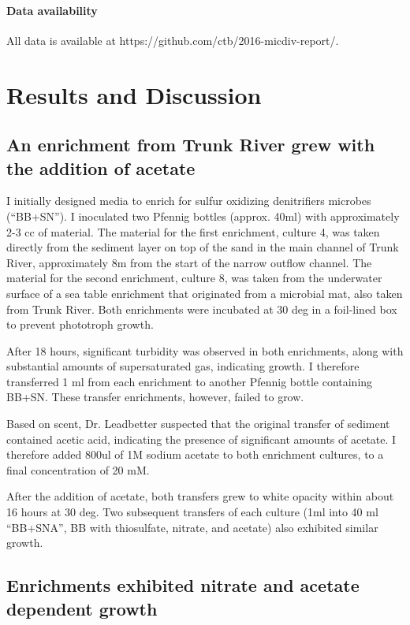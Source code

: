 \documentclass{article}
\begin{document}
\paragraph{Data availability}

All data is available at https://github.com/ctb/2016-micdiv-report/.

\section*{Results and Discussion}

\subsection*{An enrichment from Trunk River grew with the addition of acetate}

I initially designed media to enrich for sulfur oxidizing denitrifiers
microbes (``BB+SN'').  I inoculated two Pfennig bottles (approx. 40ml)
with approximately 2-3 cc of material.  The material for the first
enrichment, culture 4, was taken directly from the sediment layer on
top of the sand in the main channel of Trunk River, approximately 8m
from the start of the narrow outflow channel. The material for the
second enrichment, culture 8, was taken from the underwater surface of
a sea table enrichment that originated from a microbial mat, also
taken from Trunk River.  Both enrichments were incubated at 30 deg
in a foil-lined box to prevent phototroph growth.

After 18 hours, significant turbidity was observed in both
enrichments, along with substantial amounts of supersaturated gas,
indicating growth.  I therefore transferred 1 ml from each enrichment
to another Pfennig bottle containing BB+SN.  These transfer
enrichments, however, failed to grow.

Based on scent, Dr. Leadbetter suspected that the original transfer of
sediment contained acetic acid, indicating the presence of significant
amounts of acetate.  I therefore added 800ul of 1M sodium acetate to
both enrichment cultures, to a final concentration of 20 mM.

After the addition of acetate, both transfers grew to white opacity
within about 16 hours at 30 deg.  Two subsequent transfers of each
culture (1ml into 40 ml ``BB+SNA'', BB with thiosulfate, nitrate, and
acetate) also exhibited similar growth.

\subsection*{Enrichments exhibited nitrate and acetate dependent growth}
\end{document}
